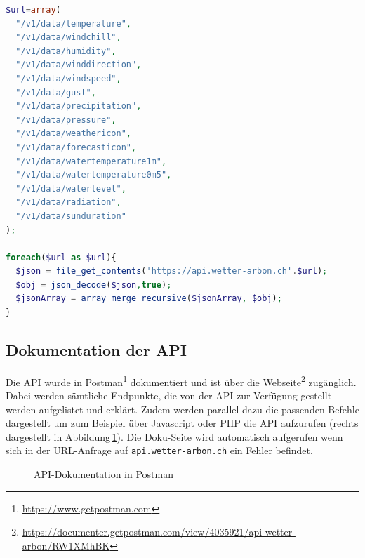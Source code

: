 \vspace{3mm}
\begin{lstlisting}[label=lst:foreach,caption=API-Abfrage auf Stufe Kategorie, language=php, style=php]
$url=array(
  "/v1/data/temperature",
  "/v1/data/windchill",
  "/v1/data/humidity",
  "/v1/data/winddirection",
  "/v1/data/windspeed",
  "/v1/data/gust",
  "/v1/data/precipitation",
  "/v1/data/pressure",
  "/v1/data/weathericon",
  "/v1/data/forecasticon",
  "/v1/data/watertemperature1m",
  "/v1/data/watertemperature0m5",
  "/v1/data/waterlevel",
  "/v1/data/radiation",
  "/v1/data/sunduration"
);

foreach($url as $url){
  $json = file_get_contents('https://api.wetter-arbon.ch'.$url);
  $obj = json_decode($json,true);
  $jsonArray = array_merge_recursive($jsonArray, $obj);
}
\end{lstlisting}
\vspace{3mm}



\subsection{Dokumentation der API}
Die API wurde in Postman\footnote{\url{https://www.getpostman.com}} dokumentiert und ist über die Webseite\footnote{\url{https://documenter.getpostman.com/view/4035921/api-wetter-arbon/RW1XMhBK}} zugänglich. Dabei werden sämtliche Endpunkte, die von der API zur Verfügung gestellt werden aufgelistet und erklärt. Zudem werden parallel dazu die passenden Befehle dargestellt um zum Beispiel über Javascript oder PHP die API aufzurufen (rechts dargestellt in Abbildung\,\ref{img:postman}). Die Doku-Seite wird automatisch aufgerufen wenn sich in der URL-Anfrage auf \texttt{api.wetter-arbon.ch} ein Fehler befindet.

\begin{figure}[htbp!]
	\centering
	\caption{API-Dokumentation in Postman}
	\label{img:postman}
\end{figure}
